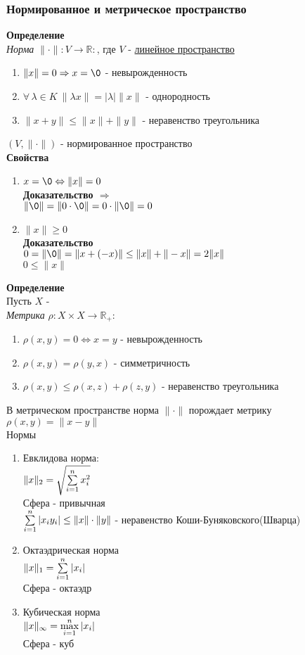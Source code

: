 \documentclass[12pt]{article}
\begin{document}
\subsubsection{Нормированное и метрическое пространство}
\textbf{Определение}\\
\textit{Норма} $\|\cdot\| : V \rightarrow \mathbb{R}:$, где $V$ - \underline{линейное пространство}
\begin{enumerate}
    \item $\|x\|=0 \Rightarrow x = \0$ - невырожденность
    \item $\forall\,\lambda\in K\ \|\lambda x\| = |\lambda|\|x\|$ - однородность
    \item $\|x+y\| \leq \|x\| + \|y\|$ - неравенство треугольника
\end{enumerate}
$(V,\|\cdot\|)$ - нормированное пространство\\
\textbf{Свойства}
\begin{enumerate}
    \item $x = \0 \Leftrightarrow \|x\| = 0$\\
    \textbf{Доказательство $\Rightarrow$}\\
    $\|\0\| = \|0\cdot\0\| = 0\cdot\|\0\| = 0$
    \item $\|x\| \geq 0$\\
    \textbf{Доказательство}\\
    $0 = \|\0\| = \|x+(-x)\| \leq \|x\| + \|-x\| = 2\|x\|$\\
    $0 \leq \|x\|$
\end{enumerate}
\textbf{Определение}\\
Пусть $X$ - \\
\textit{Метрика} $\rho: X\times X \rightarrow \mathbb{R}_+:$
\begin{enumerate}
    \item $\rho(x,y) = 0 \Leftrightarrow x = y$ - невырожденность
    \item $\rho(x,y) = \rho(y,x)$ - симметричность
    \item $\rho(x,y) \leq \rho(x,z) + \rho(z,y)$ - неравенство треугольника
\end{enumerate}
В метрическом пространстве норма $\|\cdot\|$ порождает метрику $\rho(x,y) = \|x-y\|$\\
Нормы
\begin{enumerate}
    \item Евклидова норма:\\
    $\|x\|_2 = \sqrt{\sum\limits_{i=1}^n x_i^2}$\\
    Сфера - привычная\\
    $\sum\limits_{i=1}^n |x_iy_i| \leq \|x\|\cdot\|y\|$ - неравенство Коши-Буняковского(Шварца)
    \item Октаэдрическая норма\\
    $\|x\|_1 = \sum\limits_{i=1}^n |x_i|$\\
    Сфера - октаэдр
    \item Кубическая норма\\
    $\|x\|_\infty = \max\limits_{i=1}^n |x_i|$\\
    Сфера - куб
\end{enumerate}
\end{document}
